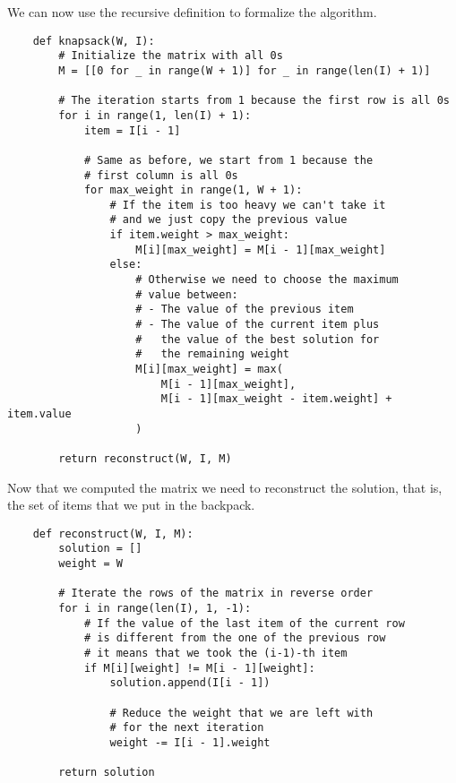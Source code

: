 \documentclass[12pt]{extarticle}
\begin{document}
We can now use the recursive definition to formalize the algorithm.

\begin{verbatim}
    def knapsack(W, I):
        # Initialize the matrix with all 0s
        M = [[0 for _ in range(W + 1)] for _ in range(len(I) + 1)]

        # The iteration starts from 1 because the first row is all 0s
        for i in range(1, len(I) + 1):
            item = I[i - 1]

            # Same as before, we start from 1 because the 
            # first column is all 0s
            for max_weight in range(1, W + 1):
                # If the item is too heavy we can't take it
                # and we just copy the previous value
                if item.weight > max_weight:
                    M[i][max_weight] = M[i - 1][max_weight]
                else:
                    # Otherwise we need to choose the maximum
                    # value between:
                    # - The value of the previous item
                    # - The value of the current item plus
                    #   the value of the best solution for
                    #   the remaining weight
                    M[i][max_weight] = max(
                        M[i - 1][max_weight],
                        M[i - 1][max_weight - item.weight] + item.value
                    )

        return reconstruct(W, I, M)
\end{verbatim}

Now that we computed the matrix we need to reconstruct the solution, that is, the set of items that we put in the backpack.

\begin{verbatim}
    def reconstruct(W, I, M):
        solution = []
        weight = W

        # Iterate the rows of the matrix in reverse order
        for i in range(len(I), 1, -1):
            # If the value of the last item of the current row
            # is different from the one of the previous row
            # it means that we took the (i-1)-th item
            if M[i][weight] != M[i - 1][weight]:
                solution.append(I[i - 1])

                # Reduce the weight that we are left with
                # for the next iteration
                weight -= I[i - 1].weight
        
        return solution
\end{verbatim}
\end{document}
